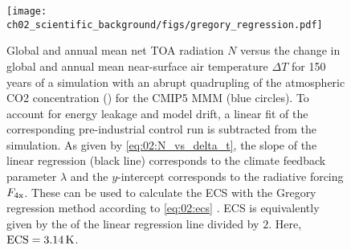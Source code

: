 \begin{figure}[t]
  \centering
  \texttt{[image: 
    ch02\_scientific\_background/figs/gregory\_regression.pdf]}
  \caption{Global and annual mean net \acf{TOA} radiation $N$ versus the change
    in global and annual mean near-surface air temperature $\Delta T$ for 150
    years of a simulation with an abrupt quadrupling of the atmospheric
    \acs{CO2} concentration () for the \acs{CMIP}5 \acl{MMM} (blue
    circles). To account for energy leakage and model drift, a linear fit of
    the corresponding pre-industrial control run is subtracted from the
     simulation. As given by \cref{eq:02:N_vs_delta_t}, the slope
    of the linear regression (black line) corresponds to the climate feedback
    parameter $\lambda$ and the $y$-intercept corresponds to the radiative
    forcing $F_\mathtxt{4x}$. These can be used to calculate the \acf{ECS} with
    the Gregory regression method according to \cref{eq:02:ecs}
    \autocite{Gregory2004}. \acs{ECS} is equivalently given by the
    \xintercept{} of the linear regression line divided by $2$. Here,
    $\mathtxt{ECS} = 3.14 \unit{K}$.}
  \label{fig:02:gregory_regression}
\end{figure}

